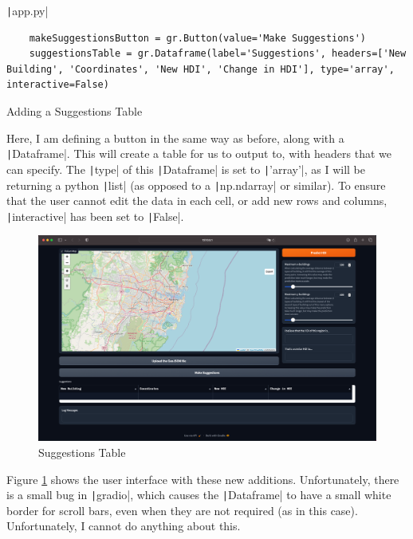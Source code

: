 \documentclass[12pt]{report}
\newcommand{\pil}[1]{\protect\texttt|#1|}
\begin{document}
\begin{listing}[H]
\pil{app.py}
\begin{verbatim}
    makeSuggestionsButton = gr.Button(value='Make Suggestions')
    suggestionsTable = gr.Dataframe(label='Suggestions', headers=['New Building', 'Coordinates', 'New HDI', 'Change in HDI'], type='array', interactive=False)
\end{verbatim}
\caption{Adding a Suggestions Table}\label{cs:suggestionsTable}
\end{listing}

Here, I am defining a button in the same way as before, along with a \pil{Dataframe}. This will create a table for us to output to, with headers that we can specify. The \pil{type} of this \pil{Dataframe} is set to \pil{'array'}, as I will be returning a python \pil{list} (as opposed to a \pil{np.ndarray} or similar). To ensure that the user cannot edit the data in each cell, or add new rows and columns, \pil{interactive} has been set to \pil{False}.

\begin{figure}[H]
\centering
\includegraphics[width=14cm]{ss13.1.png}
\caption{Suggestions Table}\label{fig:ss13.1}
\end{figure}

Figure \ref{fig:ss13.1} shows the user interface with these new additions. Unfortunately, there is a small bug in \pil{gradio}, which causes the \pil{Dataframe} to have a small white border for scroll bars, even when they are not required (as in this case). Unfortunately, I cannot do anything about this.

\begin{center}
\end{center}
\end{document}
